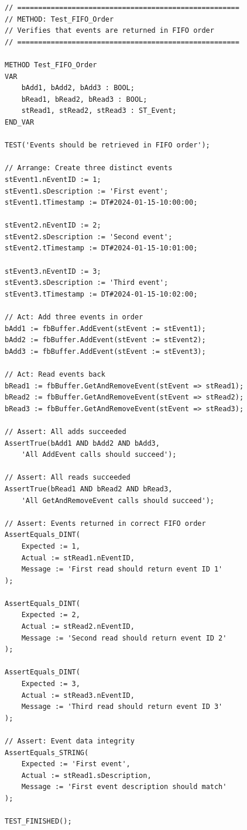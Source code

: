\documentclass[11pt,a4paper]{article}
\begin{document}
\begin{lstlisting}
// =====================================================
// METHOD: Test_FIFO_Order
// Verifies that events are returned in FIFO order
// =====================================================

METHOD Test_FIFO_Order
VAR
    bAdd1, bAdd2, bAdd3 : BOOL;
    bRead1, bRead2, bRead3 : BOOL;
    stRead1, stRead2, stRead3 : ST_Event;
END_VAR

TEST('Events should be retrieved in FIFO order');

// Arrange: Create three distinct events
stEvent1.nEventID := 1;
stEvent1.sDescription := 'First event';
stEvent1.tTimestamp := DT#2024-01-15-10:00:00;

stEvent2.nEventID := 2;
stEvent2.sDescription := 'Second event';
stEvent2.tTimestamp := DT#2024-01-15-10:01:00;

stEvent3.nEventID := 3;
stEvent3.sDescription := 'Third event';
stEvent3.tTimestamp := DT#2024-01-15-10:02:00;

// Act: Add three events in order
bAdd1 := fbBuffer.AddEvent(stEvent := stEvent1);
bAdd2 := fbBuffer.AddEvent(stEvent := stEvent2);
bAdd3 := fbBuffer.AddEvent(stEvent := stEvent3);

// Act: Read events back
bRead1 := fbBuffer.GetAndRemoveEvent(stEvent => stRead1);
bRead2 := fbBuffer.GetAndRemoveEvent(stEvent => stRead2);
bRead3 := fbBuffer.GetAndRemoveEvent(stEvent => stRead3);

// Assert: All adds succeeded
AssertTrue(bAdd1 AND bAdd2 AND bAdd3, 
    'All AddEvent calls should succeed');

// Assert: All reads succeeded
AssertTrue(bRead1 AND bRead2 AND bRead3,
    'All GetAndRemoveEvent calls should succeed');

// Assert: Events returned in correct FIFO order
AssertEquals_DINT(
    Expected := 1,
    Actual := stRead1.nEventID,
    Message := 'First read should return event ID 1'
);

AssertEquals_DINT(
    Expected := 2,
    Actual := stRead2.nEventID,
    Message := 'Second read should return event ID 2'
);

AssertEquals_DINT(
    Expected := 3,
    Actual := stRead3.nEventID,
    Message := 'Third read should return event ID 3'
);

// Assert: Event data integrity
AssertEquals_STRING(
    Expected := 'First event',
    Actual := stRead1.sDescription,
    Message := 'First event description should match'
);

TEST_FINISHED();
\end{lstlisting}
\end{document}
